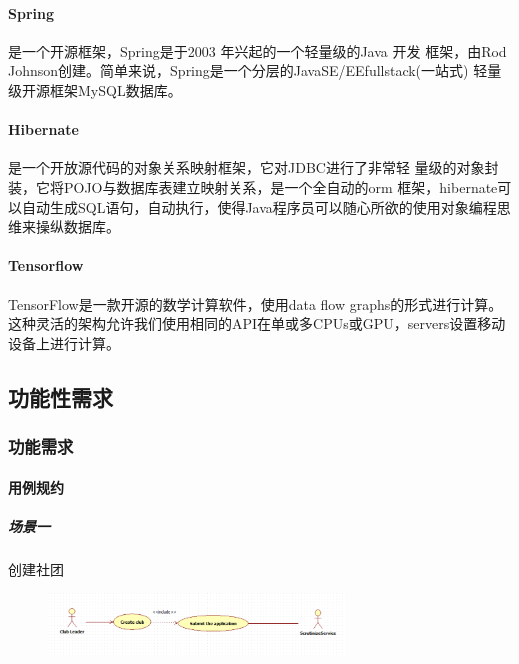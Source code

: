 \documentclass[UTF8]{ctexart}
\begin{document}
\paragraph{Spring}
是一个开源框架，Spring是于2003 年兴起的一个轻量级的Java 开发
框架，由Rod Johnson创建。简单来说，Spring是一个分层的JavaSE/EEfullstack(一站式) 轻量级开源框架MySQL数据库。
\paragraph{Hibernate}
是一个开放源代码的对象关系映射框架，它对JDBC进行了非常轻
量级的对象封装，它将POJO与数据库表建立映射关系，是一个全自动的orm
框架，hibernate可以自动生成SQL语句，自动执行，使得Java程序员可以随心所欲的使用对象编程思维来操纵数据库。
\paragraph{Tensorflow}
TensorFlow是一款开源的数学计算软件，使用data flow graphs的形式进行计算。这种灵活的架构允许我们使用相同的API在单或多CPUs或GPU，servers设置移动设备上进行计算。

\subsection{功能性需求}
\subsubsection{功能需求}
\paragraph{用例规约}
\subparagraph*{场景一}
创建社团
\newline
\begin{figure}[H]
\centering
\includegraphics[width = 0.7\textwidth]{uc-createclub.png}
\end{figure}
\end{document}
